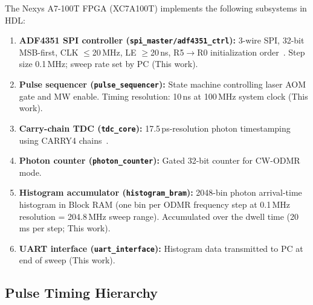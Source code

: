 The Nexys A7-100T FPGA (XC7A100T) implements the following subsystems in HDL:
\begin{enumerate}
  \item \textbf{ADF4351 SPI controller (\texttt{spi\_master/adf4351\_ctrl}):}
    3-wire SPI, 32-bit MSB-first, CLK $\leq$20\,MHz, LE $\geq$20\,ns, R5$\to$R0
    initialization order~\cite{ADF4351datasheet}. %
    Step size 0.1\,MHz; sweep rate set by PC (This work).
  \item \textbf{Pulse sequencer (\texttt{pulse\_sequencer}):}
    State machine controlling laser AOM gate and MW enable. Timing resolution:
    10\,ns at 100\,MHz system clock (This work).
  \item \textbf{Carry-chain TDC (\texttt{tdc\_core}):} 17.5\,ps-resolution photon
    timestamping using CARRY4 chains~\cite{Lim2025,Wu2010WaveUnion}.
  \item \textbf{Photon counter (\texttt{photon\_counter}):}
    Gated 32-bit counter for CW-ODMR mode.
  \item \textbf{Histogram accumulator (\texttt{histogram\_bram}):}
    2048-bin photon arrival-time histogram in Block RAM (one bin per ODMR frequency
    step at 0.1\,MHz resolution = 204.8\,MHz sweep range). Accumulated over the
    dwell time (20\,ms per step; This work).
  \item \textbf{UART interface (\texttt{uart\_interface}):}
    Histogram data transmitted to PC at end of sweep (This work).
\end{enumerate}

\subsection{Pulse Timing Hierarchy}

